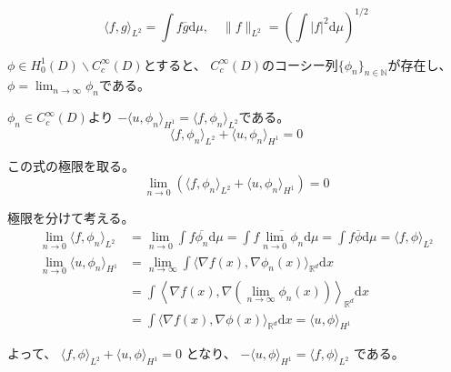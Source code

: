 \documentclass[12pt,b5paper]{ltjsarticle}
\begin{document}
\begin{description}
            \begin{equation}
             \langle f,g \rangle_{L^{2}}
              =\int f \overline{g} \mathrm{d}\mu
              ,\quad
              \| f \|_{L^{2}}
              =\left(\int \lvert f \rvert^{2} \mathrm{d}\mu \right)^{1/2}
            \end{equation}



            $\phi \in H_{0}^{1}(D) \backslash C_{c}^{\infty}(D)$とすると、
            $C_{c}^{\infty}(D)$のコーシー列$\{\phi_{n}\}_{n\in\mathbb{N}}$が存在し、
            $\phi = \lim_{n\to\infty}\phi_{n}$である。

            $\phi_{n}\in C_{c}^{\infty}(D)$より
            $-\langle u,\phi_{n} \rangle _{H^{1}}=\langle f,\phi_{n} \rangle_{L^{2}}$である。
            \begin{equation}
             \langle f,\phi_{n} \rangle_{L^{2}}+\langle u,\phi_{n} \rangle _{H^{1}}=0
            \end{equation}

            この式の極限を取る。
            \begin{equation}
             \lim_{n\to0}
              \left(\langle f,\phi_{n} \rangle_{L^{2}}+\langle u,\phi_{n} \rangle _{H^{1}}\right)
              =0
            \end{equation}


            極限を分けて考える。
            \begin{align}
             \lim_{n\to0} \langle f,\phi_{n} \rangle_{L^{2}}
             &=
             \lim_{n\to0} \int f \overline{\phi_{n}} \mathrm{d}\mu
             = \int f \overline{\lim_{n\to0} \phi_{n}} \mathrm{d}\mu
             = \int f \overline{\phi} \mathrm{d}\mu
             = \langle f,\phi \rangle_{L^{2}}\\
             \lim_{n\to0} \langle u,\phi_{n} \rangle _{H^{1}}
             &= \lim_{n\to\infty}
             \int \langle \nabla f(x), \nabla \phi_{n}(x) \rangle_{\mathbb{R}^{d}} \mathrm{d}x\\
             &= \int \left\langle \nabla f(x), \nabla \left(\lim_{n\to\infty}\phi_{n}(x)\right) \right\rangle_{\mathbb{R}^{d}} \mathrm{d}x\\
             &=\int \langle \nabla f(x), \nabla \phi(x) \rangle_{\mathbb{R}^{d}} \mathrm{d}x
             = \langle u,\phi \rangle _{H^{1}}
            \end{align}

            よって、
            $\langle f,\phi \rangle_{L^{2}}+\langle u,\phi \rangle _{H^{1}}=0$
            となり、
            $-\langle u,\phi \rangle _{H^{1}}=\langle f,\phi \rangle_{L^{2}}$
            である。
            

\end{description}
\end{document}
